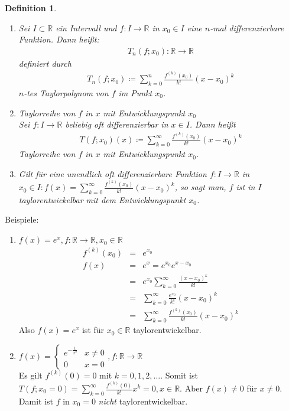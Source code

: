 \documentclass[ngerman,titlepage,twoside, parskip=half*]{scrreprt}
\newcommand*{\R}{\mathbb{R}}
\theoremstyle{break}
\newtheorem{definition}{Definition}[chapter]
\theoremstyle{nonumberbreak}
\begin{document}
\begin{definition}
  \begin{enumerate}[(1)]
    \item Sei $I\subset\R$ ein Intervall und $f\colon I\rightarrow\R$ in $x_0
      \in I$ eine $n$-mal differenzierbare Funktion. Dann heißt:
      \begin{gather*}T_n(f;x_0)\colon\R\rightarrow\R\end{gather*}
      definiert durch
      \begin{gather*}T_n(f;x_0)\coloneqq\sum_{k=0}^n \frac{f^{(k)}(x_0)}{k!}(x-x_0)^k\end{gather*}
      $n$-tes \emph{Taylorpolynom} von $f$ im
      Punkt $x_0$.
    \item Taylorreihe von $f$ in $x$ mit Entwicklungspunkt $x_0$\\
      Sei $f\colon I\rightarrow\R$ beliebig oft differenzierbar in $x\in I$.
      Dann heißt
      \begin{gather*}T(f;x_0)(x)\coloneqq\sum_{k=0}^\infty \frac{f^{(k)}(x_0)}{k!}(x-x_0)^k\end{gather*}
      \emph{Taylorreihe} von $f$ in $x$ mit
      Entwicklungspunkt $x_0$.
    \item Gilt für eine unendlich oft differenzierbare Funktion 
      $f\colon I\rightarrow\R$ in $x_0\in I\colon f(x)=\sum_{k=0}^\infty
      \frac{f^{(k)}(x_0)}{k!}(x-x_0)^k$, so sagt man, $f$ ist in $I$
      taylorentwickelbar mit dem Entwicklungspunkt $x_0$.
  \end{enumerate}
\end{definition}

Beispiele:
\begin{enumerate}[(1)]
  \item $f(x)=e^x, f\colon\R\rightarrow\R, x_0\in\R$
    \begin{align*}
      f^{(k)}(x_0)&=& e^{x_0}\\
      f(x)&=& e^x=e^{x_0}e^{x-x_0}\\
      &=& e^{x_0}\sum_{k=0}^\infty \frac{(x-x_0)^k}{k!}\\
      &=& \sum_{k=0}^\infty \frac{e^{x_0}}{k!}(x-x_0)^k\\
      &=& \sum_{k=0}^\infty \frac{f^{(k)}(x_0)}{k!}(x-x_0)^k
    \end{align*}
    Also $f(x)=e^x$ ist für $x_0\in\R$ taylorentwickelbar.
  \item $f(x)=\begin{cases}
      e^{-\frac{1}{x^2}} & x\neq 0\\
      0 & x=0
    \end{cases}, f\colon\R\rightarrow\R$\\
    Es gilt $f^{(k)}(0)=0$ mit $k=0,1,2,\dots$. Somit ist $T(f;x_0=0)=
    \sum_{k=0}^\infty \frac{f^{(k)}(0)}{k!}x^k=0, x\in\R$. Aber $f(x)
    \neq 0$ für $x\neq 0$. Damit ist $f$ in $x_0=0$ \emph{nicht}
    taylorentwickelbar.
\end{enumerate}
\end{document}
